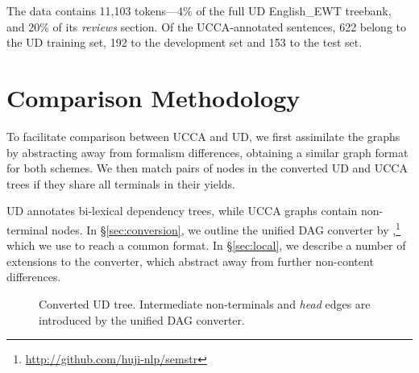 \documentclass[11pt,a4paper]{article}
\newcommand{\daniel}[1]{\footnote{\color{blue}DH: #1}}
\begin{document}
The data contains 11,103 tokens---4\% of the full UD English\_EWT treebank,
and 20\% of its \textit{reviews} section.
Of the UCCA-annotated sentences, 622 belong to the UD training set,
192 to the development set and 153 to the test set.


\section{Comparison Methodology}\label{sec:methodology}

To facilitate comparison between UCCA and UD,
we first assimilate the graphs by abstracting away from formalism differences,
obtaining a similar graph format for both schemes.
We then match pairs of nodes in the converted UD and UCCA trees
if they share all terminals in their yields.

UD annotates bi-lexical dependency trees,
while UCCA graphs contain non-terminal nodes.
In \S\ref{sec:conversion}, we outline the unified DAG converter by
\citet{hershcovich2018multitask,hershcovich2018universal},\footnote{\url{http://github.com/huji-nlp/semstr}}
which we use to reach a common format.
In \S\ref{sec:local}, we describe a number of extensions
to the converter, which abstract away from further non-content differences.

\begin{figure}[th]
  \centering
\caption{Converted UD tree.
Intermediate non-terminals and \textit{head} edges are introduced by the unified DAG converter.
}\label{fig:converted_example_ud}
\end{figure}
\end{document}
